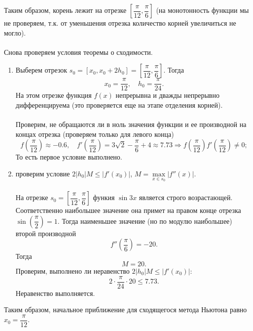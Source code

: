 \documentclass[a4paper, 12pt]{article}
\renewcommand{\leq}{\leqslant}
\begin{document}
		Таким образом, корень лежит на отрезке $\left[\dfrac{\pi}{12}, \dfrac{\pi}{6}\right]$ (на монотонность функции мы не проверяем, т.к. от уменьшения отрезка количество корней увеличиться не могло).\\\\
		Снова проверяем условия теоремы о сходимости.
		\begin{enumerate}
			\item Выберем отрезок $s_0 = [x_0, x_0 + 2h_0] = \left[\dfrac{\pi}{12}, \dfrac{\pi}{6}\right]$. Тогда $$x_0 = \dfrac{\pi}{12},\quad h_0 = \dfrac{\pi }{24}.$$
			На этом отрезке функция $f(x)$ непрерывна и дважды непрерывно дифференцируема (это проверяется еще на этапе отделения корней).\\\\
			Проверим, не обращаются ли в ноль значения функции и ее производной на концах отрезка (проверяем только для левого конца)
			$$f\left(\dfrac{\pi}{12}\right) \approx -0.6,\quad f'\left(\dfrac{\pi}{12}\right) = 3\sqrt 2 - \dfrac{\pi}{6} + 4\approx 7.73\Rightarrow f\left(\dfrac{\pi}{12}\right)f'\left(\dfrac{\pi}{12}\right)\ne 0;$$
			То есть первое условие выполнено.
			\item проверим условие $2|h_0|M \leq |f'(x_0)|$, $M = \underset{x\in s_0}{\max}|f''(x)|$.\\\\
			На отрезке $s_0 = \left[\dfrac{\pi}{12}, \dfrac\pi6\right]$ функия $\sin3x$ является строго возрастающей. Соответственно наибольшее значение она примет на правом конце отрезка $\sin \left(\dfrac\pi2\right) =1$. Тогда наименьшее значение (но по модулю наибольшее) второй производной $$f''\left(\dfrac\pi6\right)=-20.$$
			Тогда $$M = 20.$$
			Проверим, выполнено ли неравенство $2|h_0|M \leq |f'(x_0)|$:
			$$2\cdot \dfrac{\pi}{24} \cdot 20 \leq 7.73.$$
			Неравенство выполняется.
		\end{enumerate}
		Таким образом, начальное приближение для сходящегося метода Ньютона равно $x_0 = \dfrac{\pi}{12}$.
\end{document}
